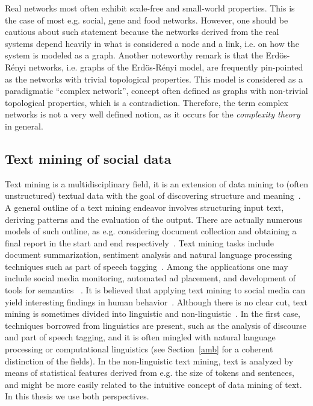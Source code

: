 Real networks most often exhibit scale-free and small-world properties.
This is the case of most e.g. social, gene and food networks.
However, one should be cautious about such statement because
the networks derived from the real systems depend heavily
in what is considered a node and a link,
i.e. on how the system is modeled as a graph.
Another noteworthy remark is that
the Erdös-Rényi networks, i.e. graphs of the Erdös-Rényi model, are frequently pin-pointed as the networks with trivial
topological properties.
This model is considered as a paradigmatic ``complex network'', concept often defined as graphs with non-trivial topological properties,
which is a contradiction. Therefore, the term complex networks is not a very well defined notion, as it occurs for the \emph{complexity theory} in general.


\subsection{Text mining of social data}
Text mining is a multidisciplinary field,
it is an extension of data mining to (often unstructured) textual data
with the goal of discovering structure and meaning~\cite{customText}.
A general outline of a text mining endeavor involves structuring input text,
deriving patterns and the evaluation of the output.
There are actually numerous models of such outline,
as e.g. considering document collection and obtaining a final report in the
start and end respectively~\cite{textSurvey}.
Text mining tasks include document summarization, sentiment analysis
and natural language processing techniques such as part of speech tagging~\cite{ntlk}.
Among the applications one may include social media monitoring, automated ad placement, and development of tools for 
semantics ~\cite{textSurvey}.
It is believed that applying text mining to social media
can yield interesting findings in human behavior~\cite{customText}.
Although there is no clear cut, text mining is sometimes divided into linguistic and non-linguistic~\cite{customText}.
In the first case, techniques borrowed from linguistics are present, such as
the analysis of discourse and part of speech tagging,
and it is often mingled with natural language processing or computational linguistics (see Section~\ref{amb} for a coherent distinction of the fields).
In the non-linguistic text mining, text is analyzed by means of statistical features
derived from e.g. the size of tokens and sentences,
and might be more easily related to the intuitive concept of data mining of text.
In this thesis we use both perspectives.

